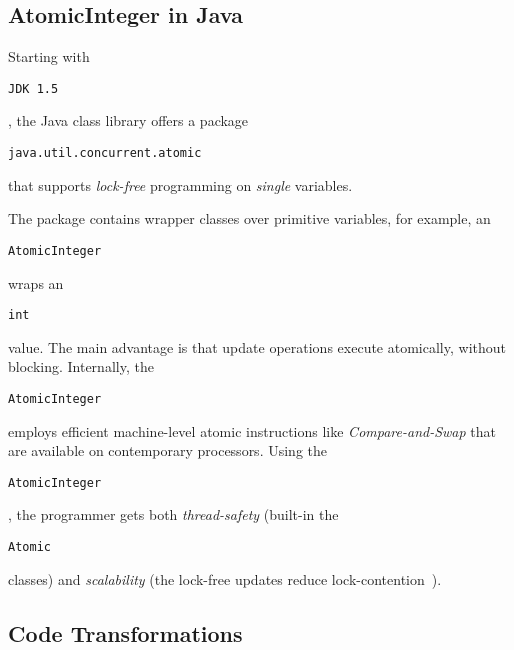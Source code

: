\documentclass[10pt,preprint]{sigplanconf}
\newcommand{\code}[1]{\begin{small}\texttt{#1}\end{small}}
\begin{document}
\subsection{AtomicInteger in Java}
Starting with \code{JDK 1.5}, the Java class library
offers a package \code{java.util.concurrent.atomic} that
supports \emph{lock-free} programming on \emph{single} variables. 

The package contains wrapper classes over primitive variables, for example,
an \code{AtomicInteger} wraps an \code{int} value. The main advantage
is that update operations execute atomically, without blocking. 
Internally, the \code{AtomicInteger} employs efficient machine-level
atomic instructions like \emph{Compare-and-Swap} that are available on 
contemporary processors. Using the \code{AtomicInteger}, the programmer
gets both \emph{thread-safety} (built-in the \code{Atomic} classes) and
\emph{scalability} (the lock-free updates reduce lock-contention~\cite{Goetz:JCP06}).

% 


 
\subsection{Code Transformations}
\end{document}
